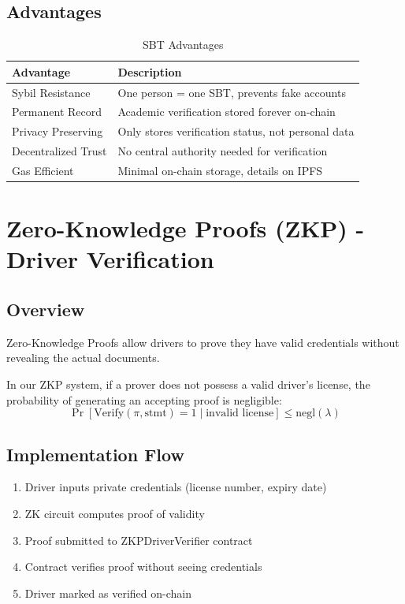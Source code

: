 \subsection{Advantages}

\begin{table}[H]
\centering
\caption{SBT Advantages}
\begin{tabular}{|l|p{8cm}|}
\hline
\textbf{Advantage} & \textbf{Description} \\
\hline
Sybil Resistance & One person = one SBT, prevents fake accounts \\
Permanent Record & Academic verification stored forever on-chain \\
Privacy Preserving & Only stores verification status, not personal data \\
Decentralized Trust & No central authority needed for verification \\
Gas Efficient & Minimal on-chain storage, details on IPFS \\
\hline
\end{tabular}
\end{table}

\section{Zero-Knowledge Proofs (ZKP) - Driver Verification}

\subsection{Overview}

Zero-Knowledge Proofs allow drivers to prove they have valid credentials without revealing the actual documents.

\begin{theorem}
In our ZKP system, if a prover does not possess a valid driver's license, the probability of generating an accepting proof is negligible:
\begin{equation}
\Pr[\text{Verify}(\pi, \text{stmt}) = 1 \mid \text{invalid license}] \leq \text{negl}(\lambda)
\end{equation}
\end{theorem}

\subsection{Implementation Flow}

\begin{enumerate}
    \item Driver inputs private credentials (license number, expiry date)
    \item ZK circuit computes proof of validity
    \item Proof submitted to ZKPDriverVerifier contract
    \item Contract verifies proof without seeing credentials
    \item Driver marked as verified on-chain
\end{enumerate}

